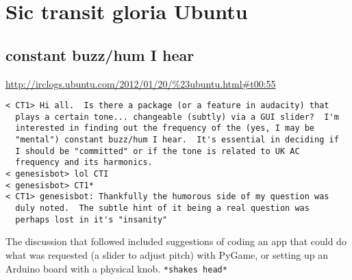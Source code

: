 \chapter{Sic transit gloria Ubuntu}

\section*{constant buzz/hum I hear}

\url{http://irclogs.ubuntu.com/2012/01/20/%23ubuntu.html#t00:55}
\begin{verbatim}
< CT1> Hi all.  Is there a package (or a feature in audacity) that 
  plays a certain tone... changeable (subtly) via a GUI slider?  I'm 
  interested in finding out the frequency of the (yes, I may be 
  "mental") constant buzz/hum I hear.  It's essential in deciding if 
  I should be "committed" or if the tone is related to UK AC 
  frequency and its harmonics.
< genesisbot> lol CTI
< genesisbot> CT1*
< CT1> genesisbot: Thankfully the humorous side of my question was 
  duly noted.  The subtle hint of it being a real question was 
  perhaps lost in it's "insanity"
\end{verbatim}

The discussion that followed included suggestions of coding an app that
could do what was requested (a slider to adjust pitch) with PyGame, or
setting up an Arduino board with a physical knob. \verb$*shakes head*$
